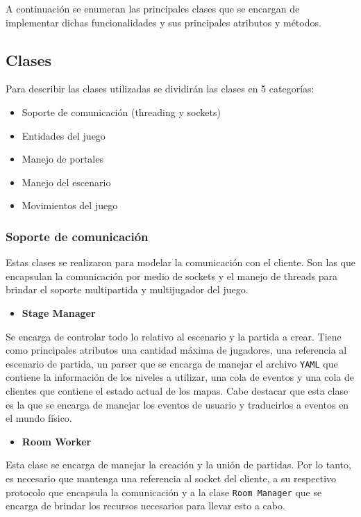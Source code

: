 \documentclass[a4paper]{article}
\begin{document}
A continuación se enumeran las principales clases que se encargan de implementar dichas funcionalidades y sus principales atributos y métodos.

\subsection{Clases}

Para describir las clases utilizadas se dividirán las clases en 5 categorías:
\begin{itemize}
	\item Soporte de comunicación (threading y sockets)
	\item Entidades del juego
	\item Manejo de portales
	\item Manejo del escenario
	\item Movimientos del juego
\end{itemize} 

\subsubsection{Soporte de comunicación}

Estas clases se realizaron para modelar la comunicación con el cliente. Son las que encapsulan la comunicación por medio de sockets y el manejo de threads para brindar el soporte multipartida y multijugador del juego.

\begin{itemize}
	\item \textbf{Stage Manager}
\end{itemize}

Se encarga de controlar todo lo relativo al escenario y la partida a crear. Tiene como principales atributos una cantidad máxima de jugadores, una referencia al escenario de partida, un parser que se encarga de manejar el archivo \texttt{YAML} que contiene la información de los niveles a utilizar, una cola de eventos y una cola de clientes que contiene el estado actual de los mapas.  Cabe destacar que esta clase es la que se encarga de manejar los eventos de usuario y traducirlos a eventos en el mundo físico.

\begin{itemize}
	\item \textbf{Room Worker}
\end{itemize}

Esta clase se encarga de manejar la creación y la unión de partidas. Por lo tanto, es necesario que mantenga una referencia al socket del cliente, a su respectivo protocolo que encapsula la comunicación y a la clase \texttt{Room Manager} que se encarga de brindar los recursos necesarios para llevar esto a cabo.
\end{document}

